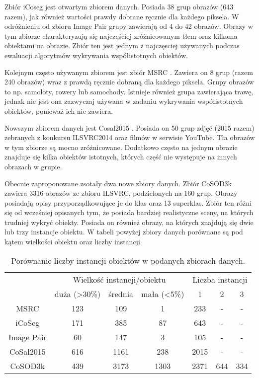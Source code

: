 \documentclass[a4paper,12pt,twoside,openany]{report}
\begin{document}
	Zbiór iCoseg \cite{iCoseg} jest otwartym zbiorem danych. Posiada 38 grup obrazów (643 razem), jak również wartości prawdy dobrane ręcznie dla każdego piksela. W odróżnieniu od zbioru Image Pair grupy zawierają od 4 do 42 obrazów. Obrazy w tym zbiorze charakteryzują się najczęściej zróżnicowanym tłem oraz kilkoma obiektami na obrazie. Zbiór ten jest jednym z najczęsciej używanych podczas ewaluacji algorytmów wykrywania współistotnych obiektów.

	Kolejnym często używanym zbiorem jest zbiór MSRC \cite{MSRC}. Zawiera on 8 grup (razem 240 obrazów) wraz z prawdą ręcznie dobraną dla każdego piksela. Grupy obrazów to np. samoloty, rowery lub samochody. Istnieje również grupa zawierająca trawę, jednak nie jest ona zazwyczaj używana w zadaniu wykrywania współistotnych obiektów, ponieważ ich nie zawiera.

	Nowszym zbiorem danych jest Cosal2015 \cite{cosal2015}. Posiada on 50 grup zdjęć (2015 razem) zebranych z konkursu ILSVRC2014 oraz filmów w serwisie YouTube. Tła obrazów w tym zbiorze są mocno zróżnicowane. Dodatkowo często na jednym obrazie znajduje się kilka obiektów istotnych, których część nie występuje na innych obrazach w grupie.

	Obecnie zaproponowane zsotały dwa nowe zbiory danych. Zbiór CoSOD3k \cite{fan2020rethinking} zawiera 3316 obrazów ze zbioru ILSVRC, podzielonych na 160 grup. Obrazy posiadają opisy przyporządkowujące je do klas oraz 13 superklas. Zbiór ten różni się od wcześniej opisanych tym, że posiada bardziej realistyczne sceny, na których trudniej wykryć obiekty. Posiada on również obrazy, na których znajdują się dwie lub trzy instancje obiektu. W tabeli powyżej zbiory danych porównane są pod kątem wielkości obiektu oraz liczby instancji.

	\begin{table}[]
		\caption{Porównanie liczby instancji obiektów w podanych zbiorach danych.}
		\begin{tabular}{c||ccc||ccc}
		\hline
				   & \multicolumn{3}{c||}{Wielkość instancji/obiektu}             & \multicolumn{3}{c}{Liczba instancji} \\
				   & duża (\textgreater{}30\%) & średnia & mała (\textless{}5\%) & 1          & 2        & 3       \\ \hline
		MSRC       & 123                       & 109     & 1                     & 233        & -        & -        \\
		iCoSeg     & 171                       & 385     & 87                    & 643        & -        & -        \\
		Image Pair & 60                        & 147     & 3                     & 105        & -        & -        \\
		CoSal2015  & 616                       & 1161    & 238                   & 2015      & -        & -        \\ \hline \hline
		CoSOD3k    & 439                       & 3173    & 1303                  & 2371       & 644      & 334      \\ \hline
		\end{tabular}
	\end{table}
\end{document}

